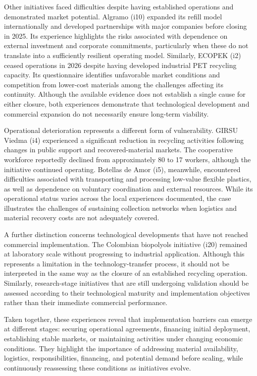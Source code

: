 \documentclass[
  12pt,
  oneside]{book}
\begin{document}
Other initiatives faced difficulties despite having established
operations and demonstrated market potential. Algramo (i10) expanded its
refill model internationally and developed partnerships with major
companies before closing in 2025. Its experience highlights the risks
associated with dependence on external investment and corporate
commitments, particularly when these do not translate into a
sufficiently resilient operating model. Similarly, ECOPEK (i2) ceased
operations in 2026 despite having developed industrial PET recycling
capacity. Its questionnaire identifies unfavorable market conditions and
competition from lower-cost materials among the challenges affecting its
continuity. Although the available evidence does not establish a single
cause for either closure, both experiences demonstrate that
technological development and commercial expansion do not necessarily
ensure long-term viability.

Operational deterioration represents a different form of vulnerability.
GIRSU Viedma (i4) experienced a significant reduction in recycling
activities following changes in public support and recovered-material
markets. The cooperative workforce reportedly declined from
approximately 80 to 17 workers, although the initiative continued
operating. Botellas de Amor (i5), meanwhile, encountered difficulties
associated with transporting and processing low-value flexible plastics,
as well as dependence on voluntary coordination and external resources.
While its operational status varies across the local experiences
documented, the case illustrates the challenges of sustaining collection
networks when logistics and material recovery costs are not adequately
covered.

A further distinction concerns technological developments that have not
reached commercial implementation. The Colombian biopolyols initiative
(i20) remained at laboratory scale without progressing to industrial
application. Although this represents a limitation in the
technology-transfer process, it should not be interpreted in the same
way as the closure of an established recycling operation. Similarly,
research-stage initiatives that are still undergoing validation should
be assessed according to their technological maturity and implementation
objectives rather than their immediate commercial performance.

Taken together, these experiences reveal that implementation barriers
can emerge at different stages: securing operational agreements,
financing initial deployment, establishing stable markets, or
maintaining activities under changing economic conditions. They
highlight the importance of addressing material availability, logistics,
responsibilities, financing, and potential demand before scaling, while
continuously reassessing these conditions as initiatives evolve.
\end{document}
